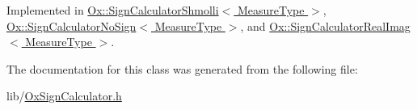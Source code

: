 Implemented in \hyperlink{class_ox_1_1_sign_calculator_shmolli_a9d9cd9b7107e43b4762846f54ff023d4}{Ox\-::\-Sign\-Calculator\-Shmolli$<$ Measure\-Type $>$}, \hyperlink{class_ox_1_1_sign_calculator_no_sign_ac480086ad668ac264393b1b18a926221}{Ox\-::\-Sign\-Calculator\-No\-Sign$<$ Measure\-Type $>$}, and \hyperlink{class_ox_1_1_sign_calculator_real_imag_ae3340d1ac5728efcaf3d5a9299f01f2c}{Ox\-::\-Sign\-Calculator\-Real\-Imag$<$ Measure\-Type $>$}.



The documentation for this class was generated from the following file\-:\begin{DoxyCompactItemize}
\item 
lib/\hyperlink{_ox_sign_calculator_8h}{Ox\-Sign\-Calculator.\-h}\end{DoxyCompactItemize}
